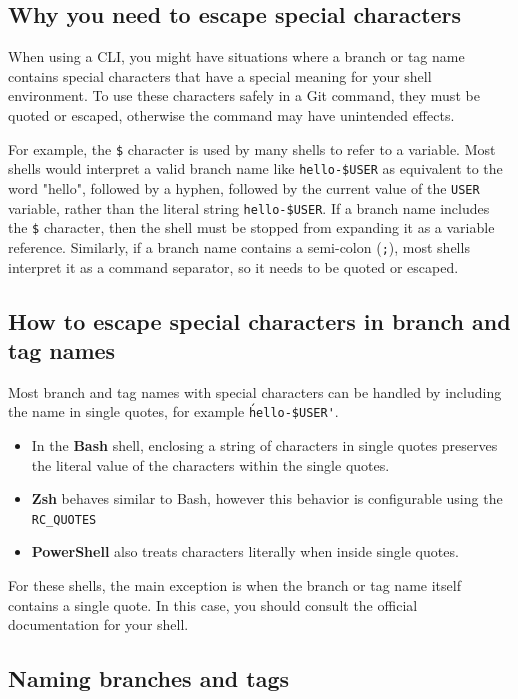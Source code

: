 \subsection{Why you need to escape special characters}

When using a CLI, you might have situations where a branch or tag name contains special characters that have a special meaning for your shell environment. To use these characters safely in a Git command, they must be quoted or escaped, otherwise the command may have unintended effects.

For example, the \texttt{\$} character is used by many shells to refer to a variable. Most shells would interpret a valid branch name like \texttt{hello-\$USER} as equivalent to the word "hello", followed by a hyphen, followed by the current value of the \texttt{USER} variable, rather than the literal string \texttt{hello-\$USER}. If a branch name includes the \texttt{\$} character, then the shell must be stopped from expanding it as a variable reference. Similarly, if a branch name contains a semi-colon (\texttt{;}), most shells interpret it as a command separator, so it needs to be quoted or escaped.

\subsection{How to escape special characters in branch and tag names}
Most branch and tag names with special characters can be handled by including the name in single quotes, for example \texttt{\'hello-\$USER\'}.
\begin{itemize}
    \item In the \textbf{Bash} shell, enclosing a string of characters in single quotes preserves the literal value of the characters within the single quotes.
    \item \textbf{Zsh} behaves similar to Bash, however this behavior is configurable using the \texttt{RC\_QUOTES}
    \item \textbf{PowerShell} also treats characters literally when inside single quotes.
\end{itemize}

For these shells, the main exception is when the branch or tag name itself contains a single quote. In this case, you should consult the official documentation for your shell.

\subsection{Naming branches and tags}

